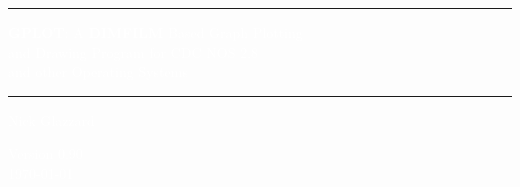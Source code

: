 \documentclass[a4paper,twoside,11pt]{article}
\begin{document}

\begin{titlepage}
\pagecolor{titlepagecolor}

\vspace*{25mm}
{\color{white} \noindent \rule{\textwidth}{3mm}}
\begin{center}
\Huge
\textcolor{white}{\textbf{GPLOT}: A \textbf{DIMFILM} Based Graph Plotting \\ and Drawing Program for CDC NOS 2.8 \\ and other Operating Systems}
\end{center}
\vspace*{2mm}
{\color{white} \noindent \rule{\textwidth}{3mm}}

\vspace*{6cm}

\begin{center}
\Large 
\textcolor{white}{
  Nick Glazzard
}
\end{center}

\vspace*{2cm}

\begin{center}
\Large 
\textcolor{white}{
Version 0.90\\
\today
}
\end{center}

\end{titlepage}

\pagecolor{white}



\clearpage

\tableofcontents

\clearpage
\end{document}
